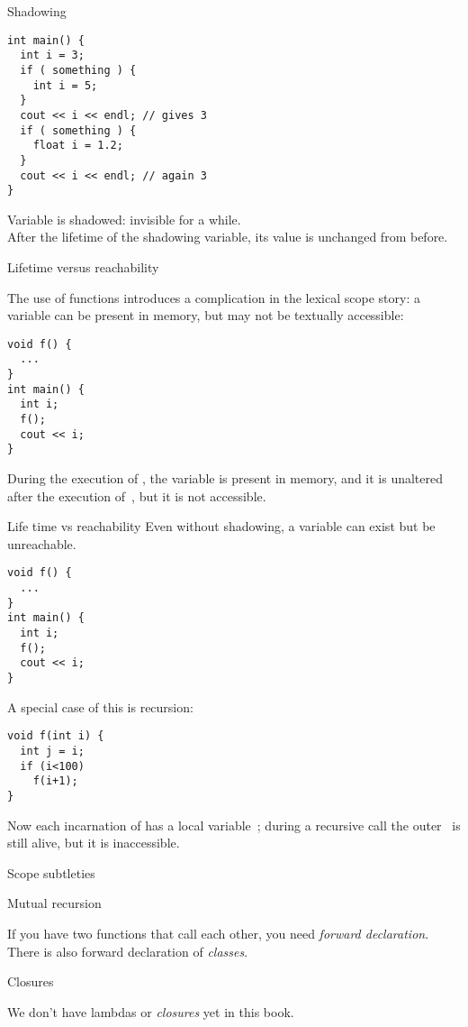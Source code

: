 \begin{slide}{Shadowing}
  \label{sl:scope-shadow}
\begin{verbatim}
int main() {
  int i = 3;
  if ( something ) {
    int i = 5;
  }
  cout << i << endl; // gives 3
  if ( something ) {
    float i = 1.2;
  }
  cout << i << endl; // again 3
}
\end{verbatim}
Variable  is shadowed: invisible for a while.\\
After the lifetime of the shadowing variable, its value is unchanged
from before.
\end{slide}

 {Lifetime versus reachability}

The use of functions introduces a complication in the lexical scope story:
a variable can be present in memory, but may not be textually accessible:
\begin{verbatim}
void f() {
  ...
}
int main() {
  int i;
  f();
  cout << i;
}
\end{verbatim}
During the execution of , the variable  is present in
memory, and it is unaltered after the execution of~,
but it is not accessible.

\begin{slide}{Life time vs reachability}
  \label{sl:scope-lifetime}
  Even without shadowing, a variable can exist but be unreachable.
\begin{verbatim}
void f() {
  ...
}
int main() {
  int i;
  f();
  cout << i;
}
\end{verbatim}
\end{slide}

A special case of this is recursion:
\begin{verbatim}
void f(int i) {
  int j = i;
  if (i<100)
    f(i+1);
}
\end{verbatim}
Now each incarnation of  has a local variable~; during a
recursive call the outer~ is still alive, but it is inaccessible.

 {Scope subtleties}

 {Mutual recursion}

If you have two functions  that call each other, you need
%
\emph{forward declaration}.
%
There is also forward declaration of
%
\emph{classes}.

 {Closures}

We don't have
%
lambdas
or
%
\emph{closures} yet in this book.

